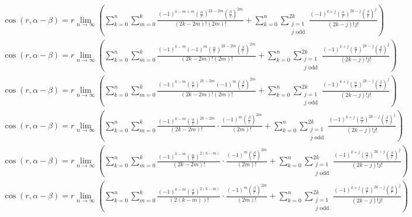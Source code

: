 \documentclass[a4paper,12pt]{report}
\begin{document}
\begin{landscape}
{\begin{gather}
\cos(r,\alpha - \beta) = r \lim \limits_{n \to \infty} \left(\sum \limits_{k=0}^{n} \sum \limits_{m=0}^k \frac{(-1)^{k-m+m} \left(\frac{\alpha}{r}\right)^{2k-2m} \left(\frac{\beta}{r}\right)^{2m}}{(2k-2m)! (2m)!} + \sum \limits_{k=0}^{n} \sum \limits_{\substack{j=1 \\ j \text{ odd}}}^{2k} \frac{(-1)^{k+j} \left(\frac{\alpha}{r}\right)^{2k-j} \left(\frac{\beta}{r}\right)^j}{(2k-j)! j!}\right) \\
\cos(r,\alpha - \beta) = r \lim \limits_{n \to \infty} \left(\sum \limits_{k=0}^{n} \sum \limits_{m=0}^k \frac{(-1)^{k-m} (-1)^m \left(\frac{\alpha}{r}\right)^{2k-2m} \left(\frac{\beta}{r}\right)^{2m}}{(2k-2m)! (2m)!} + \sum \limits_{k=0}^{n} \sum \limits_{\substack{j=1 \\ j \text{ odd}}}^{2k} \frac{(-1)^{k+j} \left(\frac{\alpha}{r}\right)^{2k-j} \left(\frac{\beta}{r}\right)^j}{(2k-j)! j!}\right) \\
\cos(r,\alpha - \beta) = r \lim \limits_{n \to \infty} \left(\sum \limits_{k=0}^{n} \sum \limits_{m=0}^k \frac{(-1)^{k-m} \left(\frac{\alpha}{r}\right)^{2k-2m} (-1)^m \left(\frac{\beta}{r}\right)^{2m}}{(2k-2m)! (2m)!} + \sum \limits_{k=0}^{n} \sum \limits_{\substack{j=1 \\ j \text{ odd}}}^{2k} \frac{(-1)^{k+j} \left(\frac{\alpha}{r}\right)^{2k-j} \left(\frac{\beta}{r}\right)^j}{(2k-j)! j!}\right) \\
\cos(r,\alpha - \beta) = r \lim \limits_{n \to \infty} \left(\sum \limits_{k=0}^{n} \sum \limits_{m=0}^k \frac{(-1)^{k-m} \left(\frac{\alpha}{r}\right)^{2k-2m}}{(2k-2m)!} \cdot \frac{(-1)^m \left(\frac{\beta}{r}\right)^{2m}}{(2m)!} + \sum \limits_{k=0}^{n} \sum \limits_{\substack{j=1 \\ j \text{ odd}}}^{2k} \frac{(-1)^{k+j} \left(\frac{\alpha}{r}\right)^{2k-j} \left(\frac{\beta}{r}\right)^j}{(2k-j)! j!}\right) \\
\cos(r,\alpha - \beta) = r \lim \limits_{n \to \infty} \left(\sum \limits_{k=0}^{n} \sum \limits_{m=0}^k \frac{(-1)^{k-m} \left(\frac{\alpha}{r}\right)^{2(k-m)}}{(2k-2m)!} \cdot \frac{(-1)^m \left(\frac{\beta}{r}\right)^{2m}}{(2m)!} + \sum \limits_{k=0}^{n} \sum \limits_{\substack{j=1 \\ j \text{ odd}}}^{2k} \frac{(-1)^{k+j} \left(\frac{\alpha}{r}\right)^{2k-j} \left(\frac{\beta}{r}\right)^j}{(2k-j)! j!}\right) \\
\cos(r,\alpha - \beta) = r \lim \limits_{n \to \infty} \left(\sum \limits_{k=0}^{n} \sum \limits_{m=0}^k \frac{(-1)^{k-m} \left(\frac{\alpha}{r}\right)^{2(k-m)}}{(2(k-m))!} \cdot \frac{(-1)^m \left(\frac{\beta}{r}\right)^{2m}}{(2m)!} + \sum \limits_{k=0}^{n} \sum \limits_{\substack{j=1 \\ j \text{ odd}}}^{2k} \frac{(-1)^{k+j} \left(\frac{\alpha}{r}\right)^{2k-j} \left(\frac{\beta}{r}\right)^j}{(2k-j)! j!}\right) \\

\end{gather}}
\end{landscape}
\end{document}
